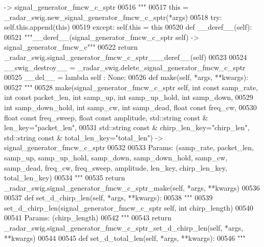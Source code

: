 \begin{DoxyCode}
{{{{{       -> signal\_generator\_fmcw\_c\_sptr}
00516 \textcolor{stringliteral}{        """}
00517         this = \_radar\_swig.new\_signal\_generator\_fmcw\_c\_sptr(*args)
00518         \textcolor{keywordflow}{try}: self.this.append(this)
00519         \textcolor{keywordflow}{except}: self.this = this
00520     \textcolor{keyword}{def }__deref__(self):
00521         \textcolor{stringliteral}{"""\_\_deref\_\_(signal\_generator\_fmcw\_c\_sptr self) -> signal\_generator\_fmcw\_c"""}
00522         \textcolor{keywordflow}{return} \_radar\_swig.signal\_generator\_fmcw\_c\_sptr\_\_\_deref\_\_(self)
00523 
00524     \_\_swig\_destroy\_\_ = \_radar\_swig.delete\_signal\_generator\_fmcw\_c\_sptr
00525     \_\_del\_\_ = \textcolor{keyword}{lambda} self : \textcolor{keywordtype}{None};
00526     \textcolor{keyword}{def }make(self, *args, **kwargs):
00527         \textcolor{stringliteral}{"""}
00528 \textcolor{stringliteral}{        make(signal\_generator\_fmcw\_c\_sptr self, int const samp\_rate, int const packet\_len, int samp\_up, int
       samp\_up\_hold, int samp\_down, }
00529 \textcolor{stringliteral}{            int samp\_down\_hold, int samp\_cw, int samp\_dead, float const freq\_cw, }
00530 \textcolor{stringliteral}{            float const freq\_sweep, float const amplitude, std::string const & len\_key="packet\_len", }
00531 \textcolor{stringliteral}{            std::string const & chirp\_len\_key="chirp\_len", std::string const & total\_len\_key="total\_len")
       -> signal\_generator\_fmcw\_c\_sptr}
00532 \textcolor{stringliteral}{}
00533 \textcolor{stringliteral}{        Params: (samp\_rate, packet\_len, samp\_up, samp\_up\_hold, samp\_down, samp\_down\_hold, samp\_cw,
       samp\_dead, freq\_cw, freq\_sweep, amplitude, len\_key, chirp\_len\_key, total\_len\_key)}
00534 \textcolor{stringliteral}{        """}
00535         \textcolor{keywordflow}{return} \_radar\_swig.signal\_generator\_fmcw\_c\_sptr\_make(self, *args, **kwargs)
00536 
00537     \textcolor{keyword}{def }set_d_chirp_len(self, *args, **kwargs):
00538         \textcolor{stringliteral}{"""}
00539 \textcolor{stringliteral}{        set\_d\_chirp\_len(signal\_generator\_fmcw\_c\_sptr self, int chirp\_length)}
00540 \textcolor{stringliteral}{}
00541 \textcolor{stringliteral}{        Params: (chirp\_length)}
00542 \textcolor{stringliteral}{        """}
00543         \textcolor{keywordflow}{return} \_radar\_swig.signal\_generator\_fmcw\_c\_sptr\_set\_d\_chirp\_len(self, *args, **kwargs)
00544 
00545     \textcolor{keyword}{def }set_d_total_len(self, *args, **kwargs):
00546         \textcolor{stringliteral}{"""}
}}}}
\end{DoxyCode}
